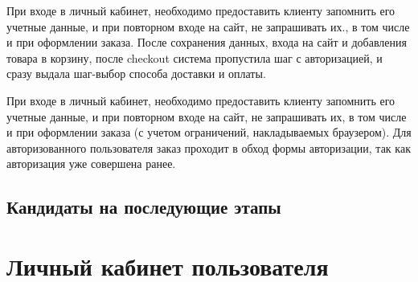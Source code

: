 {

\begin{wiki}
При входе в личный кабинет, необходимо предоставить клиенту запомнить его учетные данные, и при повторном входе на сайт, не запрашивать их., в том числе и при оформлении заказа. После сохранения данных, входа на сайт и добавления товара в корзину, после checkout система пропустила шаг с авторизацией, и сразу выдала шаг-выбор способа доставки и оплаты. 
\end{wiki}


\begin{itogo}
При входе в личный кабинет, необходимо предоставить клиенту запомнить его учетные данные, и при повторном входе на сайт, не запрашивать их, в том числе и при оформлении заказа (с учетом ограничений, накладываемых браузером). 
Для авторизованного пользователя заказ проходит в обход формы авторизации, так как авторизация уже совершена ранее.
\end{itogo}

}

\ifcand
\subsection{Кандидаты на последующие этапы}
\fi

\section{Личный кабинет пользователя}

\ifcand
